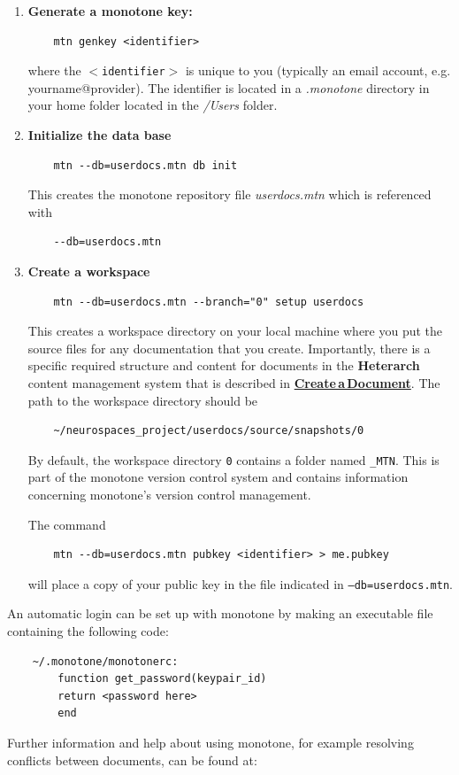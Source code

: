 \documentclass[12pt]{article}
\begin{document}
\begin{enumerate}

\item {\bf Generate a monotone key:} 
\begin{verbatim}
    mtn genkey <identifier>
\end{verbatim}
where the {\tt $<$identifier$>$} is unique to you (typically an email account, e.g. yourname@provider). The identifier is located in a {\it .monotone} directory in your home folder located in the {\it /Users} folder.

\item {\bf Initialize the data base}
\begin{verbatim}
    mtn --db=userdocs.mtn db init
\end{verbatim}
This creates the monotone repository file {\it userdocs.mtn} which is referenced with
\begin{verbatim}
    --db=userdocs.mtn
\end{verbatim}

\item {\bf Create a workspace}
\begin{verbatim}
    mtn --db=userdocs.mtn --branch="0" setup userdocs
\end{verbatim}
This creates a workspace directory on your local machine where you put the source files for any documentation that you create. Importantly, there is a specific required structure and content for documents in the {\bf\small{Heterarch}} content management system that is described in \href{../document-create/document-create.tex}{\bf Create\,a\,Document}. The path to the workspace directory should be
\begin{verbatim}
    ~/neurospaces_project/userdocs/source/snapshots/0
\end{verbatim}
By default, the workspace directory {\tt 0} contains a folder named {\tt \_MTN}. This is part of the monotone version control system and contains information concerning monotone's version control management.

The command
\begin{verbatim}
    mtn --db=userdocs.mtn pubkey <identifier> > me.pubkey
\end{verbatim}
will place a copy of your public key in the file indicated in {\tt --db=userdocs.mtn}.
\end{enumerate}
An automatic login can be set up with monotone by making an executable file containing the following code:
\begin{verbatim}
    ~/.monotone/monotonerc:
        function get_password(keypair_id)
        return <password here>
        end

\end{verbatim}
Further information and help about using monotone, for example resolving conflicts between documents, can be found at:
\end{document}
